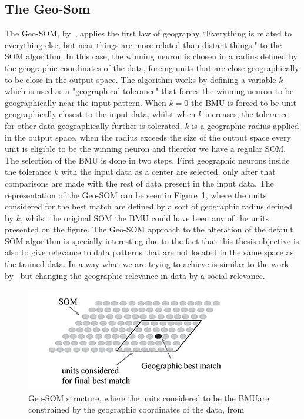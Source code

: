 \subsection{The Geo-Som} 
\label{sub:types_of_soms}
The Geo-SOM, by~\citet{Bacao2005}, applies the first law of geography “Everything is related to everything else, but near things are more related than distant things." to the \ac{SOM} algorithm. In this case, the winning neuron is chosen in a radius defined by the geographic-coordinates of the data, forcing units that are close geographically to be close in the output space. 
The algorithm works by defining a variable $k$ which is used as a "geographical tolerance" that forces the winning neuron to be geographically near the input pattern. When $k=0$ the \ac{BMU} is forced to be unit geographically closest to the input data, whilst when $k$ increases, the tolerance for other data geographically further is tolerated. $k$ is a geographic radius applied in the output space, when the radius exceeds the size of the output space every unit is eligible to be the winning neuron and therefor we have a regular SOM.
The selection of the \ac{BMU} is done in two steps. First geographic neurons inside the tolerance $k$ with the input data as a center are selected, only after that comparisons are made with the rest of data present in the input data. The representation of the Geo-SOM can be seen in Figure~\ref{fig:geo_som}, where the units considered for the best match are defined by a sort of geographic radius defined by $k$, whilst the original \ac{SOM} the \ac{BMU} could have been any of the units presented on the figure.
The Geo-SOM approach to the alteration of the default \ac{SOM} algorithm is specially interesting due to the fact that this thesis objective is also to give relevance to data patterns that are not located in the same space as the trained data. In a way what we are trying to achieve is similar to the work by~\citet{Bacao2005} but changing the geographic relevance in data by a social relevance.
\begin{figure}[tb]
  \begin{center}
    \includegraphics[]{images/6_geo-som.png}
  \end{center}
  \caption{Geo-SOM structure, where the units considered to be the \ac{BMU}are constrained by the geographic coordinates of the data, from~\citet{Bacao2005}}
  \label{fig:geo_som}
\end{figure}

